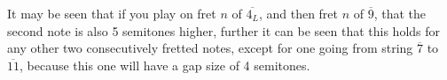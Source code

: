 \documentclass[preview]{standalone}
\begin{document}
\begin{center}
It may be seen that if you play on fret $n$ of $\overline{4_L}$, and then fret $n$ of $\overline{9}$, that the second note is also 5 semitones higher, further it can be seen that this holds for any other two consecutively fretted notes, except for one going from string $\overline{7}$ to $\overline{11}$, because this one will have a gap size of 4 semitones.
\end{center}
\end{document}
